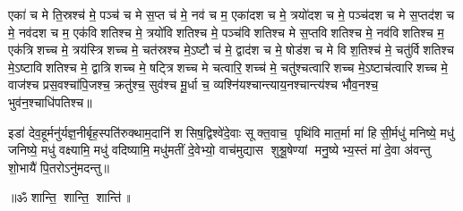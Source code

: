
एका॑ च मे ति॒स्रश्च॑ मे॒ पञ्च॑ च मे स॒प्त च॑ मे॒ नव॑ च म॒ एका॑दश च मे॒ त्रयो॑दश च मे॒ पञ्च॑दश च मे स॒प्तद॑श च मे॒ नव॑दश च म॒ एक॑विशतिश्च मे॒ त्रयो॑विशतिश्च मे॒ पञ्च॑विशतिश्च मे स॒प्तविशतिश्च मे॒ नव॑विशतिश्च म॒ एक॑त्रिशच्च मे॒ त्रय॑स्त्रिशच्च मे॒ चत॑स्रश्च मे॒ऽष्टौ च॑ मे॒ द्वाद॑श च मे॒ षोड॑श च मे विश॒तिश्च॑ मे॒ चतु॑र्विशतिश्च मे॒ऽष्टाविशतिश्च मे॒ द्वात्रिशच्च मे॒ षट्त्रिशच्च मे चत्वारि॒शच्च॑ मे॒ चतु॑श्चत्वारिशच्च मे॒ऽष्टाच॑त्वारिशच्च मे॒ वाज॑श्च प्रस॒वश्चा॑पि॒जश्च॒ क्रतु॑श्च॒ सुव॑श्च मू॒र्धा च॒ व्यश्नि॑यश्चान्त्याय॒नश्चान्त्य॑श्च भौव॒नश्च॒ भुव॑न॒श्चाधि॑पतिश्च॥ 


\lbrack इडा॑ देव॒हूर्मनु॑र्यज्ञ॒नीर्बृह॒स्पति॑रुक्थाम॒दानि॑ शसिष॒द्विश्वे॑\-दे॒वाः सूक्त॒वाच॒ पृथि॑वि मात॒र्मा मा॑ हिसी॒र्मधु॑ मनिष्ये॒ मधु॑ जनिष्ये॒ मधु॑ वक्ष्यामि॒ मधु॑ वदिष्यामि॒ मधु॑मतीं दे॒वेभ्यो॒ वाच॑मुद्यास शुश्रू॒षेण्यां मनु॒ष्येभ्य॒स्तं मा॑ दे॒वा अ॑वन्तु शो॒भायै॑ पि॒तरोऽनु॑मदन्तु॥\rbrack

\centerline{॥ॐ शान्ति॒ शान्ति॒ शान्ति॑॥}

{\small \closesection}
